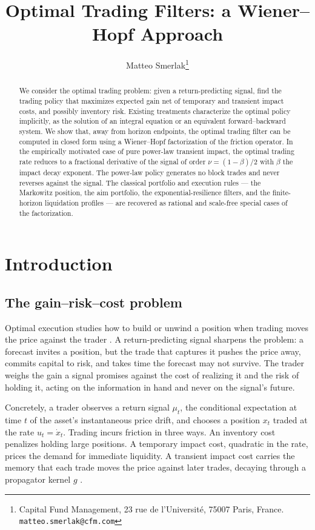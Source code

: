 \documentclass[11pt]{article}
\title{Optimal Trading Filters: a Wiener--Hopf Approach}
\author{Matteo Smerlak\thanks{Capital Fund Management, 23 rue de l'Universit\'e, 75007 Paris, France. \texttt{matteo.smerlak@cfm.com}}}
\date{}
\theoremstyle{plain}
\theoremstyle{definition}
\theoremstyle{remark}
\begin{document}
\maketitle

\begin{abstract}
We consider the optimal trading problem: given a return-predicting signal, find the trading policy that maximizes expected gain net of temporary and transient impact costs, and possibly inventory risk. Existing treatments characterize the optimal policy implicitly, as the solution of an integral equation or an equivalent forward--backward system. We show that, away from horizon endpoints, the optimal trading filter can be computed in closed form using a Wiener--Hopf factorization of the friction operator. In the empirically motivated case of pure power-law transient impact, the optimal trading rate reduces to a fractional derivative of the signal of order $\nu = (1-\beta)/2$ with $\beta$ the impact decay exponent. The power-law policy generates no block trades and never reverses against the signal. The classical portfolio and execution rules --- the Markowitz position, the aim portfolio, the exponential-resilience filters, and the finite-horizon liquidation profiles --- are recovered as rational and scale-free special cases of the factorization.
\end{abstract}

\section{Introduction}\label{sec:intro}

\subsection{The gain--risk--cost problem}\label{sec:problem}

Optimal execution studies how to build or unwind a position when trading moves the price against the trader \citep{AlmgrenChriss2001,GatheralSchiedSlynko2012}. A return-predicting signal sharpens the problem: a forecast invites a position, but the trade that captures it pushes the price away, commits capital to risk, and takes time the forecast may not survive. The trader weighs the gain a signal promises against the cost of realizing it and the risk of holding it, acting on the information in hand and never on the signal's future.

Concretely, a trader observes a return signal $\mu_t$, the conditional expectation at time $t$ of the asset's instantaneous price drift, and chooses a position $x_t$ traded at the rate $u_t=\dot x_t$. Trading incurs friction in three ways. An inventory cost penalizes holding large positions. A temporary impact cost, quadratic in the rate, prices the demand for immediate liquidity. A transient impact cost carries the memory that each trade moves the price against later trades, decaying through a propagator kernel $g$ \citep{BouchaudGefenPottersWyart2004,Gatheral2010}. 
\end{document}
